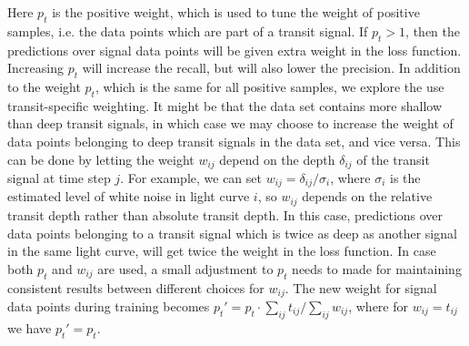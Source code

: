 Here $p_t$ is the positive weight, which is used to tune the weight of positive samples, i.e. the data points which are part of a transit signal. If $p_t > 1$, then the predictions over signal data points will be given extra weight in the loss function. Increasing $p_t$ will increase the recall, but will also lower the precision. In addition to the weight $p_t$, which is the same for all positive samples, we explore the use transit-specific weighting. It might be that the data set contains more shallow than deep transit signals, in which case we may choose to increase the weight of data points belonging to deep transit signals in the data set, and vice versa. This can be done by letting the weight $w_{ij}$ depend on the depth $\delta_{ij}$ of the transit signal at time step $j$. For example, we can set $w_{ij} = \delta_{ij} / \sigma_{i}$, where $\sigma_i$ is the estimated level of white noise in light curve $i$, so $w_{ij}$ depends on the relative transit depth rather than absolute transit depth. In this case, predictions over data points belonging to a transit signal which is twice as deep as another signal in the same light curve, will get twice the weight in the loss function. In case both $p_t$ and $w_{ij}$ are used, a small adjustment to $p_t$ needs to made for maintaining consistent results between different choices for $w_{ij}$. The new weight for signal data points during training becomes  $p_t' = p_t \cdot \sum_{ij} t_{ij} / \sum_{ij} w_{ij}$, where for $w_{ij} = t_{ij}$ we have $p_t' = p_t$.


